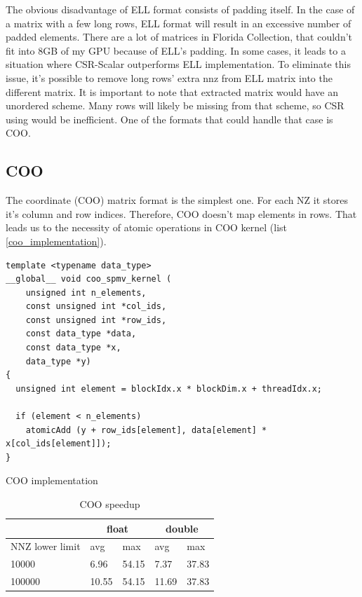 \documentclass{article}
\begin{document}
The obvious disadvantage of ELL format consists of padding itself. In the case of a matrix with a few long rows, ELL format will result in 
an excessive number of padded elements. There are a lot of matrices in Florida Collection, that couldn't fit into 8GB of my GPU because
of ELL's padding. In some cases, it leads to a situation where CSR-Scalar outperforms ELL implementation. To eliminate this
issue, it's possible to remove long rows' extra nnz from ELL matrix into the different matrix. It is important to note that
extracted matrix would have an unordered scheme. Many rows will likely be missing from that scheme, so CSR using would be inefficient. 
One of the formats that could handle that case is COO.

\subsection{COO}

The coordinate (COO) matrix format is the simplest one. For each NZ it stores it's column and row indices. Therefore, COO doesn't 
map elements in rows. That leads us to the necessity of atomic operations in COO kernel (list \ref{coo_implementation}).

\begin{listing}[H]
\begin{verbatim}
template <typename data_type>
__global__ void coo_spmv_kernel (
    unsigned int n_elements,
    const unsigned int *col_ids,
    const unsigned int *row_ids,
    const data_type *data,
    const data_type *x,
    data_type *y)
{
  unsigned int element = blockIdx.x * blockDim.x + threadIdx.x;

  if (element < n_elements)
    atomicAdd (y + row_ids[element], data[element] * x[col_ids[element]]);
}
\end{verbatim}
\caption{COO implementation}
\label{coo_implementation}
\end{listing}

\begin{table}[H]
	\centering
	\begin{tabular}{ |p{2.6cm}||p{1cm}|p{1cm}|p{1cm}|p{1cm}|  }
	 \hline
		& \multicolumn{2}{|c|}{float} & \multicolumn{2}{|c|}{double}\\
	 \hline
	 NNZ lower limit & avg & max & avg & max  \\
	 \hline
	 10000  & 6.96  & 54.15 & 7.37  & 37.83 \\
	 100000 & 10.55 & 54.15 & 11.69 & 37.83 \\
	 \hline
	\end{tabular}
	\caption{COO speedup}
  \label{csr_coo_speedup_table}
\end{table}
\end{document}
